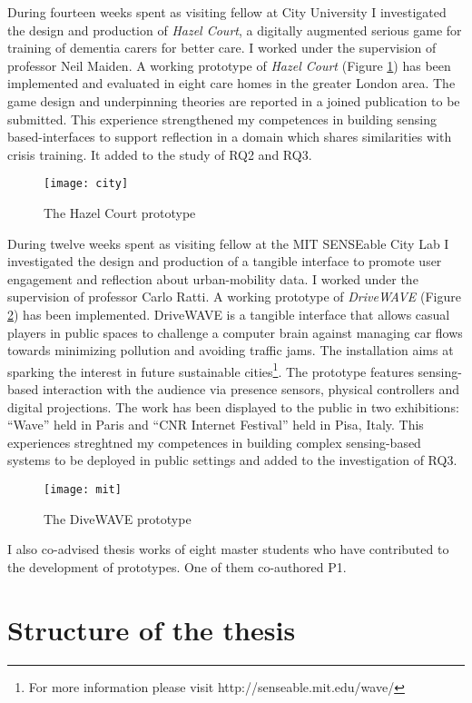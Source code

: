 During fourteen weeks spent as visiting fellow at City University I investigated the design and production of \emph{Hazel Court}, a digitally augmented serious game for training of dementia carers for better care. I worked under the supervision of professor Neil Maiden. A working prototype of \emph{Hazel Court} (Figure \ref{fig:hazel-court}) has been implemented and evaluated in eight care homes in the greater London area. The game design and underpinning theories are reported in a joined publication to be submitted. This experience strengthened my competences in building sensing based-interfaces to support reflection in a domain which shares similarities with crisis training. It added to the study of RQ2 and RQ3.
\begin{figure}
	[h] \centering 
	\texttt{[image: city]} \caption{The Hazel Court prototype} \label{fig:hazel-court} 
\end{figure}

During twelve weeks spent as visiting fellow at the MIT SENSEable City Lab I investigated the design and production of a tangible interface to promote user engagement and reflection about urban-mobility data. I worked under the supervision of professor Carlo Ratti. A working prototype of \emph{DriveWAVE} (Figure \ref{fig:drivewave}) has been implemented. DriveWAVE is a tangible interface that allows casual players in public spaces to challenge a computer brain against managing car flows towards minimizing pollution and avoiding traffic jams. The installation aims at sparking the interest in future sustainable cities\footnote{For more information please visit http://senseable.mit.edu/wave/}. The prototype features sensing-based interaction with the audience via presence sensors, physical controllers and digital projections. The work has been displayed to the public in two exhibitions: ``Wave'' held in Paris and ``CNR Internet Festival'' held in Pisa, Italy. This experiences streghtned my competences in building complex sensing-based systems to be deployed in public settings and added to the investigation of RQ3.
\begin{figure}
	[h] \centering 
	\texttt{[image: mit]} \caption{The DiveWAVE prototype} \label{fig:drivewave} 
\end{figure}

I also co-advised thesis works of eight master students who have contributed to the development of prototypes. One of them co-authored P1.

\section{Structure of the thesis}\label{structure-of-the-thesis}

